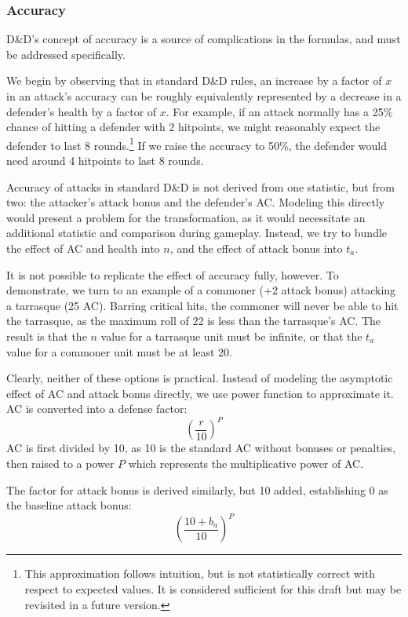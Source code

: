 \subsubsection{Accuracy}

D\&D's concept of accuracy is a source of complications in the formulas,
and must be addressed specifically.

We begin by observing that in standard D\&D rules,
an increase by a factor of $x$ in an attack's accuracy
can be roughly equivalently represented by a decrease in a defender's
health by a factor of $x$.
For example, if an attack normally has a 25\% chance of hitting a defender with 2 hitpoints,
we might reasonably expect the defender to last 8 rounds.\footnote{
    This approximation follows intuition,
    but is not statistically correct with respect to expected values.
    It is considered sufficient for this draft
    but may be revisited in a future version.
}
If we raise the accuracy to 50\%,
the defender would need around 4 hitpoints to last 8 rounds.

Accuracy of attacks in standard D\&D is not derived from one statistic,
but from two: the attacker's attack bonus and the defender's AC.
Modeling this directly would present a problem for the transformation,
as it would necessitate an additional statistic and comparison during gameplay.
Instead, we try to bundle the effect of AC and health into $n$,
and the effect of attack bonus into $t_a$.

It is not possible to replicate the effect of accuracy fully, however.
To demonstrate, we turn to an example of a commoner (+2 attack bonus)
attacking a tarrasque (25 AC).
Barring critical hits, the commoner will never be able to hit the tarrasque,
as the maximum roll of 22 is less than the tarrasque's AC.
The result is that the $n$ value for a tarrasque unit must be infinite,
or that the $t_a$ value for a commoner unit must be at least 20.

Clearly, neither of these options is practical.
Instead of modeling the asymptotic effect of AC and attack bonus directly,
we use power function to approximate it.
AC is converted into a defense factor:
\[
    \left(\frac{r}{10}\right)^P
\]
AC is first divided by 10,
as 10 is the standard AC without bonuses or penalties,
then raised to a power $P$ which represents the multiplicative power of AC.

The factor for attack bonus is derived similarly,
but 10 added, establishing 0 as the baseline attack bonus:
\[
    \left(\frac{10 + b_a}{10}\right)^P
\]

